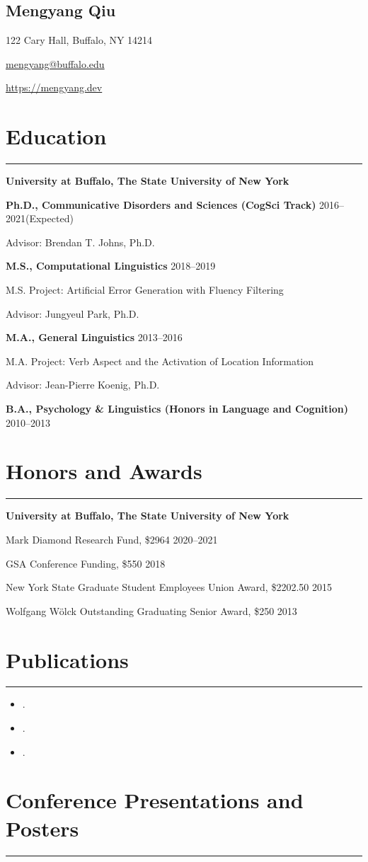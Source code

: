 \documentclass[11pt]{article}
\newcommand{\name}[1]{\begin{center}\section*{\Huge #1}\end{center}}
\newcommand{\topinfo}[1]{\begin{center}\vspace{-0.2cm}#1\vspace{-0.2cm}\end{center}}
\newcommand{\cvsection}[1]{\vspace{-0.2cm}\section*{\Large #1}\vspace{-0.2cm}\hrule\vspace{0.2cm}}
\begin{document}
\name{Mengyang Qiu}
\topinfo{122 Cary Hall, Buffalo, NY 14214}
\topinfo{\href{mailto:mengyang@buffalo.edu}{mengyang@buffalo.edu}}
\topinfo{\url{https://mengyang.dev}}


\cvsection{Education}

\textbf{University at Buffalo, The State University of New York}

\textbf{Ph.D., Communicative Disorders and Sciences (CogSci Track)} \hfill 2016--2021(Expected)

\quad Advisor: Brendan T. Johns, Ph.D.

\textbf{M.S., Computational Linguistics} \hfill 2018--2019

\quad M.S. Project: Artificial Error Generation with Fluency Filtering

\quad Advisor: Jungyeul Park, Ph.D.

\textbf{M.A., General Linguistics} \hfill 2013--2016

\quad M.A. Project: Verb Aspect and the Activation of Location Information

\quad Advisor: Jean-Pierre Koenig, Ph.D.

\textbf{B.A., Psychology \& Linguistics (Honors in Language and Cognition)} \hfill 2010--2013


\cvsection{Honors and Awards}

\textbf{University at Buffalo, The State University of New York}

Mark Diamond Research Fund, \$2964 \hfill 2020--2021

GSA Conference Funding, \$550 \hfill 2018

New York State Graduate Student Employees Union Award, \$2202.50 \hfill 2015

Wolfgang W{\"o}lck Outstanding Graduating Senior Award, \$250 \hfill 2013


\cvsection{Publications}

\begin{itemize}[leftmargin=!,labelindent=!,itemindent=-15pt]
    \setlength\itemsep{0.3em}

    \item[] .
    \item[] .
    \item[] .

\end{itemize}


\cvsection{Conference Presentations and Posters}
\end{document}
